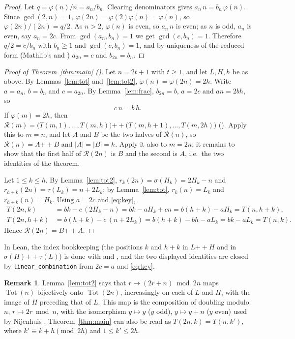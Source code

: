 \documentclass[11pt]{amsart}
\theoremstyle{plain}
\theoremstyle{definition}
\newtheorem{remark}[theorem]{Remark}
\newcommand{\Tot}{\operatorname{Tot}}
\newcommand{\R}{\mathcal{R}}
\newcommand{\cat}{\mathbin{+\!\!+}}
\begin{document}
\begin{proof}
Let $q=\varphi(n)/n=a_n/b_n$. Clearing denominators gives $a_n\,n=b_n\,\varphi(n)$. Since $\gcd(2,n)=1$, $\varphi(2n)=\varphi(2)\varphi(n)=\varphi(n)$, so $\varphi(2n)/(2n)=q/2$.
As $n>2$, $\varphi(n)$ is even, so $a_n\,n$ is even; as $n$ is odd, $a_n$ is even, say $a_n=2c$. From $\gcd(a_n,b_n)=1$ we get $\gcd(c,b_n)=1$. Therefore $q/2=c/b_n$ with $b_n\ge1$ and $\gcd(c,b_n)=1$, and by uniqueness of the reduced form (Mathlib's  and ) $a_{2n}=c$ and $b_{2n}=b_n$.
\end{proof}

\begin{proof}[Proof of Theorem~\ref{thm:main} ()]
Let $n=2t+1$ with $t\ge1$, and let $L,H,h$ be as above. By Lemmas~\ref{lem:tot} and~\ref{lem:tot2}, $\varphi(n)=\varphi(2n)=2h$. Write $a=a_n$, $b=b_n$ and $c=a_{2n}$. By Lemma~\ref{lem:frac}, $b_{2n}=b$, $a=2c$ and $an=2bh$, so
\begin{equation}\label{eq:key}
  c\,n=b\,h .
\end{equation}
If $\varphi(m)=2h$, then $\R(m)=\bigl(T(m,1),\dots,T(m,h)\bigr)\cat\bigl(T(m,h+1),\dots,T(m,2h)\bigr)$ (). Apply this to $m=n$, and let $A$ and $B$ be the two halves of $\R(n)$, so $\R(n)=A\cat B$ and $|A|=|B|=h$. Apply it also to $m=2n$; it remains to show that the first half of $\R(2n)$ is $B$ and the second is $A$, i.e.\ the two identities of the theorem.

Let $1\le k\le h$. By Lemma~\ref{lem:tot2}, $r_k(2n)=\sigma(H_k)=2H_k-n$ and $r_{h+k}(2n)=\tau(L_k)=n+2L_k$; by Lemma~\ref{lem:tot}, $r_k(n)=L_k$ and $r_{h+k}(n)=H_k$. Using $a=2c$ and \eqref{eq:key},
\begin{align*}
  T(2n,k)&=bk-c\,(2H_k-n)=bk-aH_k+cn=b(h+k)-aH_k=T(n,h+k),\\
  T(2n,h+k)&=b(h+k)-c\,(n+2L_k)=b(h+k)-bh-aL_k=bk-aL_k=T(n,k).
\end{align*}
Hence $\R(2n)=B\cat A$.
\end{proof}

In Lean, the index bookkeeping (the positions $k$ and $h+k$ in $L\cat H$ and in $\sigma(H)\cat\tau(L)$) is done with  and , and the two displayed identities are closed by \texttt{linear\_combination} from $2c=a$ and \eqref{eq:key}.

\begin{remark}\label{rem:map}
Lemma~\ref{lem:tot2} says that $r\mapsto(2r+n)\bmod 2n$ maps $\Tot(n)$ bijectively onto $\Tot(2n)$, increasingly on each of $L$ and $H$, with the image of $H$ preceding that of $L$. This map is the composition of doubling modulo $n$, $r\mapsto 2r\bmod n$, with the isomorphism $y\mapsto y$ ($y$ odd), $y\mapsto y+n$ ($y$ even) used by Nijenhuis \cite{Nij}. Theorem~\ref{thm:main} can also be read as $T(2n,k)=T(n,k')$, where $k'\equiv k+h\pmod{2h}$ and $1\le k'\le 2h$.
\end{remark}
\end{document}

